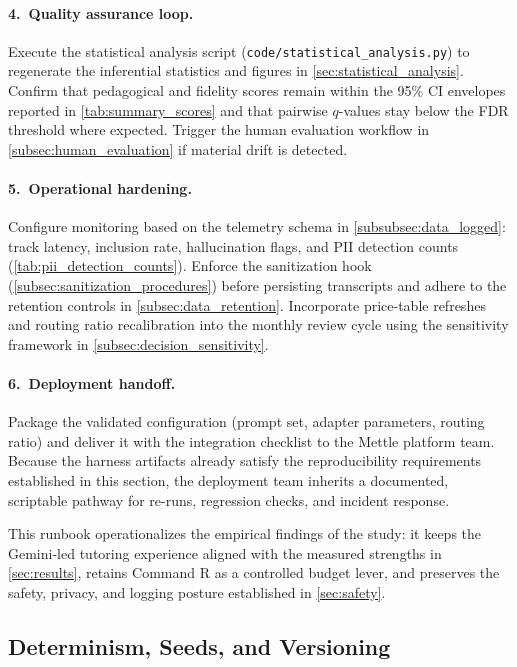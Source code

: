 \paragraph{4.~Quality assurance loop.} Execute the statistical analysis script (\texttt{code/statistical\_analysis.py}) to regenerate the inferential statistics and figures in \cref{sec:statistical_analysis}. Confirm that pedagogical and fidelity scores remain within the 95\% CI envelopes reported in \cref{tab:summary_scores} and that pairwise $q$-values stay below the FDR threshold where expected. Trigger the human evaluation workflow in \cref{subsec:human_evaluation} if material drift is detected.

\paragraph{5.~Operational hardening.} Configure monitoring based on the telemetry schema in \cref{subsubsec:data_logged}: track latency, inclusion rate, hallucination flags, and PII detection counts (\cref{tab:pii_detection_counts}). Enforce the sanitization hook (\cref{subsec:sanitization_procedures}) before persisting transcripts and adhere to the retention controls in \cref{subsec:data_retention}. Incorporate price-table refreshes and routing ratio recalibration into the monthly review cycle using the sensitivity framework in \cref{subsec:decision_sensitivity}.

\paragraph{6.~Deployment handoff.} Package the validated configuration (prompt set, adapter parameters, routing ratio) and deliver it with the integration checklist to the Mettle platform team. Because the harness artifacts already satisfy the reproducibility requirements established in this section, the deployment team inherits a documented, scriptable pathway for re-runs, regression checks, and incident response.

This runbook operationalizes the empirical findings of the study: it keeps the Gemini-led tutoring experience aligned with the measured strengths in \cref{sec:results}, retains Command R as a controlled budget lever, and preserves the safety, privacy, and logging posture established in \cref{sec:safety}.

\subsection{Determinism, Seeds, and Versioning}
\label{subsec:determinism}

